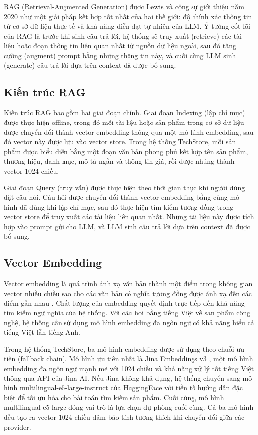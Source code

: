 RAG (Retrieval-Augmented Generation) được Lewis và cộng sự giới thiệu năm 2020 \cite{lewis2020rag} như một giải pháp kết hợp tốt nhất của hai thế giới: độ chính xác thông tin từ cơ sở dữ liệu thực tế và khả năng diễn đạt tự nhiên của LLM. Ý tưởng cốt lõi của RAG là trước khi sinh câu trả lời, hệ thống sẽ truy xuất (retrieve) các tài liệu hoặc đoạn thông tin liên quan nhất từ nguồn dữ liệu ngoài, sau đó tăng cường (augment) prompt bằng những thông tin này, và cuối cùng LLM sinh (generate) câu trả lời dựa trên context đã được bổ sung.

\subsection{Kiến trúc RAG}

Kiến trúc RAG bao gồm hai giai đoạn chính. Giai đoạn Indexing (lập chỉ mục) được thực hiện offline, trong đó mỗi tài liệu hoặc sản phẩm trong cơ sở dữ liệu được chuyển đổi thành vector embedding thông qua một mô hình embedding, sau đó vector này được lưu vào vector store. Trong hệ thống TechStore, mỗi sản phẩm được biểu diễn bằng một đoạn văn bản phong phú kết hợp tên sản phẩm, thương hiệu, danh mục, mô tả ngắn và thông tin giá, rồi được nhúng thành vector 1024 chiều.

Giai đoạn Query (truy vấn) được thực hiện theo thời gian thực khi người dùng đặt câu hỏi. Câu hỏi được chuyển đổi thành vector embedding bằng cùng mô hình đã dùng khi lập chỉ mục, sau đó thực hiện tìm kiếm tương đồng trong vector store để truy xuất các tài liệu liên quan nhất. Những tài liệu này được tích hợp vào prompt gửi cho LLM, và LLM sinh câu trả lời dựa trên context đã được bổ sung.

\subsection{Vector Embedding}

Vector embedding là quá trình ánh xạ văn bản thành một điểm trong không gian vector nhiều chiều sao cho các văn bản có nghĩa tương đồng được ánh xạ đến các điểm gần nhau \cite{devlin2019bert}. Chất lượng của embedding quyết định trực tiếp đến khả năng tìm kiếm ngữ nghĩa của hệ thống. Với câu hỏi bằng tiếng Việt về sản phẩm công nghệ, hệ thống cần sử dụng mô hình embedding đa ngôn ngữ có khả năng hiểu cả tiếng Việt lẫn tiếng Anh.

Trong hệ thống TechStore, ba mô hình embedding được sử dụng theo chuỗi ưu tiên (fallback chain). Mô hình ưu tiên nhất là Jina Embeddings v3 \cite{jinaai2024}, một mô hình embedding đa ngôn ngữ mạnh mẽ với 1024 chiều và khả năng xử lý tốt tiếng Việt thông qua API của Jina AI. Nếu Jina không khả dụng, hệ thống chuyển sang mô hình multilingual-e5-large-instruct của HuggingFace với tiền tố hướng dẫn đặc biệt để tối ưu hóa cho bài toán tìm kiếm sản phẩm. Cuối cùng, mô hình multilingual-e5-large đóng vai trò là lựa chọn dự phòng cuối cùng. Cả ba mô hình đều tạo ra vector 1024 chiều đảm bảo tính tương thích khi chuyển đổi giữa các provider.

